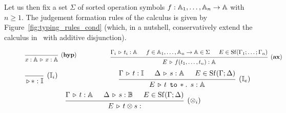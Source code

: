 \documentclass[submission,copyright,creativecommons]{eptcs}
\begin{document}
Let us then fix a set $\Sigma$ of sorted operation symbols $f :
\mathbb{A}_1,\dots,\mathbb{A}_n \to \mathbb{A}$ with $n \geq 1$. The judgement formation
rules of the calculus is given by Figure~\ref{fig:typing_rules_cond} (which, in
a nutshell, conservatively extend the calculus in~\cite{dahlqvist22,dahlqvist23}
with additive disjunction). 
\begin{figure}[h]
    \begin{equation*}
            \begin{prooftree}
                    \infer0[\rulename{hyp}]{ x : \typeA  \vljud x : \typeA}
            \end{prooftree}
            \hspace{2cm}
            \begin{prooftree}
                    \hypo{\Gamma_i \vljud t_i : \typeA}
                    \hypo{f \in \typeA_1, \dots , \typeA_n \to \typeA \in \Sigma}
                    \hypo{E \in \Shuff(\Gamma_1; \dots ; \Gamma_n)}
                    \infer3[\rulename{ax}]{E \vljud f(t_1,\dots,t_n) : \typeA}
            \end{prooftree}
    \end{equation*}
    \vspace{0.25cm}
    \begin{equation*}
            \begin{prooftree}
                    \infer0[\rulename{$\typeI_i$}]{ \vljud \ast : \typeI}
            \end{prooftree}
            \hspace{3cm}
            \begin{prooftree}
                    \hypo{\Gamma \vljud t : \typeI}
                    \hypo{\Delta \vljud s : \typeA}
                    \hypo{E \in \Shuff(\Gamma; \Delta)}
                    \infer3[\rulename{$\typeI_e$}]{
                    E \vljud \ielim{t}{s} : \typeA}
            \end{prooftree}
    \end{equation*}
    \vspace{0.25cm}
    \begin{equation*}
            \begin{prooftree}
                    \hypo{\Gamma \vljud t : \typeA}
                    \hypo{\Delta \vljud s : \typeB}
                    \hypo{E \in \Shuff(\Gamma;\Delta)}
                    \infer3[\rulename{$\otimes_i$}]{E \vljud t \otimes s : 
}
\end{prooftree}
\end{equation*}
\end{figure}
\end{document}
